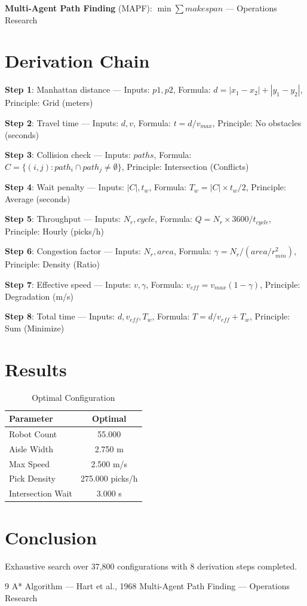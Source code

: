 \documentclass[11pt,twocolumn]{article}
\begin{document}
\textbf{Multi-Agent Path Finding} (MAPF): $\min \sum makespan$ --- Operations Research


\section{Derivation Chain}
\textbf{Step 1}: Manhattan distance --- Inputs: $p1, p2$, Formula: $d = |x_1-x_2| + |y_1-y_2|$, Principle: Grid (meters)


\textbf{Step 2}: Travel time --- Inputs: $d, v$, Formula: $t = d/v_{max}$, Principle: No obstacles (seconds)


\textbf{Step 3}: Collision check --- Inputs: $paths$, Formula: $C = \{(i,j): path_i \cap path_j \neq \emptyset\}$, Principle: Intersection (Conflicts)


\textbf{Step 4}: Wait penalty --- Inputs: $|C|, t_w$, Formula: $T_w = |C| \times t_w / 2$, Principle: Average (seconds)


\textbf{Step 5}: Throughput --- Inputs: $N_r, cycle$, Formula: $Q = N_r \times 3600 / t_{cycle}$, Principle: Hourly (picks/h)


\textbf{Step 6}: Congestion factor --- Inputs: $N_r, area$, Formula: $\gamma = N_r / (area/r_{min}^2)$, Principle: Density (Ratio)


\textbf{Step 7}: Effective speed --- Inputs: $v, \gamma$, Formula: $v_{eff} = v_{max} (1 - \gamma)$, Principle: Degradation (m/s)


\textbf{Step 8}: Total time --- Inputs: $d, v_{eff}, T_w$, Formula: $T = d/v_{eff} + T_w$, Principle: Sum (Minimize)


\section{Results}
\begin{table}[h]
\centering
\caption{Optimal Configuration}
\begin{tabular}{@{}lc@{}}
\toprule
Parameter & Optimal \\
\midrule
Robot Count & 55.000  \\
Aisle Width & 2.750 m \\
Max Speed & 2.500 m/s \\
Pick Density & 275.000 picks/h \\
Intersection Wait & 3.000 s \\
\bottomrule
\end{tabular}
\end{table}

\section{Conclusion}
Exhaustive search over 37,800 configurations with 8 derivation steps completed.

\begin{thebibliography}{9}
 A* Algorithm --- Hart et al., 1968
 Multi-Agent Path Finding --- Operations Research
\end{thebibliography}
\end{document}

